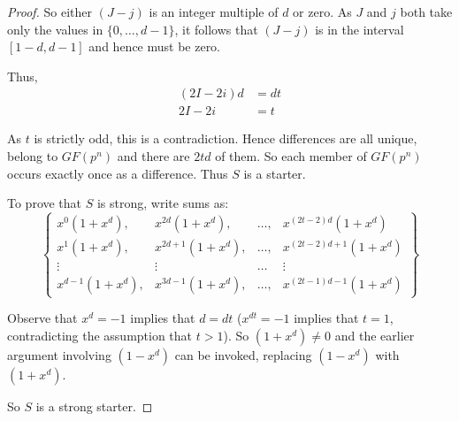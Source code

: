 \begin{proof}
So either $(J - j)$ is an integer multiple of $d$ or zero.
As $J$ and $j$ both take only the values in $\{0, \ldots, d - 1\}$, it follows that $(J - j)$ is in the interval $[1 - d, d - 1]$ and hence must be zero.

Thus,
\begin{eqnarray*}
  (2I - 2i)d &= dt \\
     2I - 2i &= t
\end{eqnarray*}

As $t$ is strictly odd, this is a contradiction.
Hence differences are all unique, belong to $GF(p^n)$ and there are $2td$ of them.
So each member of $GF(p^n)$ occurs exactly once as a difference.
Thus $S$ is a starter.

To prove that $S$ is strong, write sums as:
\begin{equation*}
  \left\{
  \begin{array}{cccc}
    x^0(1 + x^d), & x^{2d}(1 + x^d), & \ldots, & x^{(2t - 2)d}(1 + x^d) \\
    x^1(1 + x^d), & x^{2d + 1}(1 + x^d), & \ldots, & x^{(2t - 2)d + 1}(1 + x^d) \\
    \vdots & \vdots & \ldots & \vdots \\
    x^{d - 1}(1 + x^d), & x^{3d - 1}(1 + x^d), & \ldots, & x^{(2t - 1)d - 1}(1 + x^d)
  \end{array}
  \right\}
\end{equation*}

Observe that $x^d = -1$ implies that $d = dt$ ($x^{dt} = -1$ implies that $t = 1$, contradicting the assumption that $t > 1$).
So $(1 + x^d) \neq 0$ and the earlier argument involving $(1 - x^d)$ can be invoked, replacing $(1 - x^d)$ with $(1 + x^d)$.

So $S$ is a strong starter.
\end{proof}
